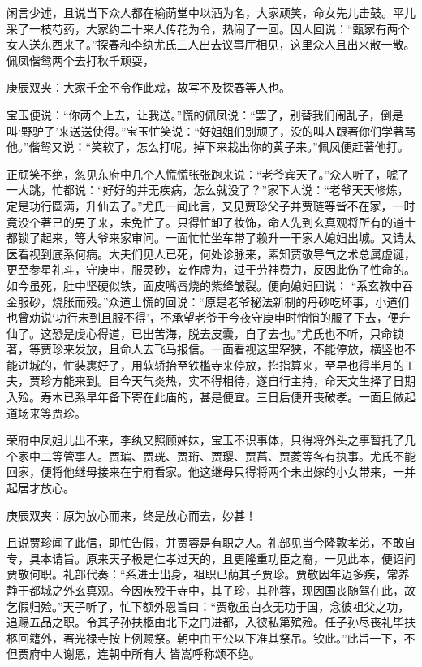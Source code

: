 \begin{parag}
    闲言少述，且说当下众人都在榆荫堂中以酒为名，大家顽笑，命女先儿击鼓。平儿采了一枝芍药，大家约二十来人传花为令，热闹了一回。因人回说：“甄家有两个女人送东西来了。”探春和李纨尤氏三人出去议事厅相见，这里众人且出来散一散。佩凤偕鸳两个去打秋千顽耍，\begin{note}庚辰双夹：大家千金不令作此戏，故写不及探春等人也。\end{note}宝玉便说：“你两个上去，让我送。”慌的佩凤说：“罢了，别替我们闹乱子，倒是叫‘野驴子’来送送使得。”宝玉忙笑说：“好姐姐们别顽了，没的叫人跟著你们学著骂他。”偕鸳又说：“笑软了，怎么打呢。掉下来栽出你的黄子来。”佩凤便赶著他打。
\end{parag}


\begin{parag}
    正顽笑不绝，忽见东府中几个人慌慌张张跑来说：“老爷宾天了。”众人听了，唬了一大跳，忙都说：“好好的并无疾病，怎么就没了？”家下人说：“老爷天天修炼，定是功行圆满，升仙去了。”尤氏一闻此言，又见贾珍父子并贾琏等皆不在家，一时竟没个著已的男子来，未免忙了。只得忙卸了妆饰，命人先到玄真观将所有的道士都锁了起来，等大爷来家审问。一面忙忙坐车带了赖升一干家人媳妇出城。又请太医看视到底系何病。大夫们见人已死，何处诊脉来，素知贾敬导气之术总属虚诞，更至参星礼斗，守庚申，服灵砂，妄作虚为，过于劳神费力，反因此伤了性命的。如今虽死，肚中坚硬似铁，面皮嘴唇烧的紫绛皱裂。便向媳妇回说： “系玄教中吞金服砂，烧胀而殁。”众道士慌的回说：“原是老爷秘法新制的丹砂吃坏事，小道们也曾劝说‘功行未到且服不得’，不承望老爷于今夜守庚申时悄悄的服了下去，便升仙了。这恐是虔心得道，已出苦海，脱去皮囊，自了去也。”尤氏也不听，只命锁著，等贾珍来发放，且命人去飞马报信。一面看视这里窄狭，不能停放，横竖也不能进城的，忙装裹好了，用软轿抬至铁槛寺来停放，掐指算来，至早也得半月的工夫，贾珍方能来到。目今天气炎热，实不得相待，遂自行主持，命天文生择了日期入殓。寿木已系早年备下寄在此庙的，甚是便宜。三日后便开丧破孝。一面且做起道场来等贾珍。
\end{parag}


\begin{parag}
    荣府中凤姐儿出不来，李纨又照顾姊妹，宝玉不识事体，只得将外头之事暂托了几个家中二等管事人。贾㻞、贾珖、贾珩、贾璎、贾菖、贾菱等各有执事。尤氏不能回家，便将他继母接来在宁府看家。他这继母只得将两个未出嫁的小女带来，一并起居才放心。\begin{note}庚辰双夹：原为放心而来，终是放心而去，妙甚！\end{note}
\end{parag}


\begin{parag}
    且说贾珍闻了此信，即忙告假，并贾蓉是有职之人。礼部见当今隆敦孝弟，不敢自专，具本请旨。原来天子极是仁孝过天的，且更隆重功臣之裔，一见此本，便诏问贾敬何职。礼部代奏：“系进士出身，祖职已荫其子贾珍。贾敬因年迈多疾，常养静于都城之外玄真观。今因疾殁于寺中，其子珍，其孙蓉，现因国丧随驾在此，故乞假归殓。”天子听了，忙下额外恩旨曰：“贾敬虽白衣无功于国，念彼祖父之功，追赐五品之职。令其子孙扶柩由北下之门进都，入彼私第殡殓。任子孙尽丧礼毕扶柩回籍外，著光禄寺按上例赐祭。朝中由王公以下准其祭吊。钦此。”此旨一下，不但贾府中人谢恩，连朝中所有大 皆嵩呼称颂不绝。
\end{parag}


